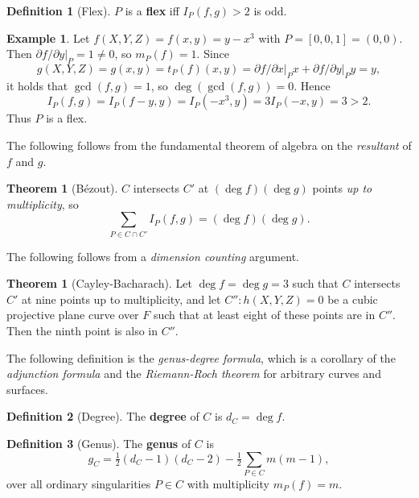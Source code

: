 \documentclass{article}
\newcommand{\val}[1]{\left. #1 \right\rvert}
\newcommand{\rb}[1]{\left( #1 \right)}
\renewcommand{\sb}[1]{\left[ #1 \right]}
\theoremstyle{definition}\newtheorem*{definition}{Definition}
\theoremstyle{definition}\newtheorem*{example}{Example}
\theoremstyle{definition}\newtheorem*{remark}{Remark}
\newtheorem{theorem}[proposition]{Theorem}
\begin{document}
\begin{definition}[Flex]
$ P $ is a \textbf{flex} iff $ I_P\rb{f, g} > 2 $ is odd.
\end{definition}

\begin{example}
Let $ f\rb{X, Y, Z} = f\rb{x, y} = y - x^3 $ with $ P = \sb{0, 0, 1} = \rb{0, 0} $. Then $ \val{\partial f / \partial y}_P = 1 \ne 0 $, so $ m_P\rb{f} = 1 $. Since
$$ g\rb{X, Y, Z} = g\rb{x, y} = t_P\rb{f}\rb{x, y} = \val{\partial f / \partial x}_Px + \val{\partial f / \partial y}_Py = y, $$
it holds that $ \gcd\rb{f, g} = 1 $, so $ \deg\rb{\gcd\rb{f, g}} = 0 $. Hence
$$ I_P\rb{f, g} = I_P\rb{f - y, y} = I_P\rb{-x^3, y} = 3I_P\rb{-x, y} = 3 > 2. $$
Thus $ P $ is a flex.
\end{example}

The following follows from the fundamental theorem of algebra on the \emph{resultant} of $ f $ and $ g $.

\begin{theorem}[Bézout]
$ C $ intersects $ C' $ at $ \rb{\deg f}\rb{\deg g} $ points \emph{up to multiplicity}, so
$$ \sum_{P \in C \cap C'} I_P\rb{f, g} = \rb{\deg f}\rb{\deg g}. $$
\end{theorem}

The following follows from a \emph{dimension counting} argument.

\begin{theorem}[Cayley-Bacharach]
Let $ \deg f = \deg g = 3 $ such that $ C $ intersects $ C' $ at nine points up to multiplicity, and let $ C'' : h\rb{X, Y, Z} = 0 $ be a cubic projective plane curve over $ F $ such that at least eight of these points are in $ C'' $. Then the ninth point is also in $ C'' $.
\end{theorem}

The following definition is the \emph{genus-degree formula}, which is a corollary of the \emph{adjunction formula} and the \emph{Riemann-Roch theorem} for arbitrary curves and surfaces.

\begin{definition}[Degree]
The \textbf{degree} of $ C $ is $ d_C = \deg f $.
\end{definition}

\begin{definition}[Genus]
The \textbf{genus} of $ C $ is
$$ g_C = \tfrac{1}{2}\rb{d_C - 1}\rb{d_C - 2} - \tfrac{1}{2}\sum_{P \in C} m\rb{m - 1}, $$
over all ordinary singularities $ P \in C $ with multiplicity $ m_P\rb{f} = m $.
\end{definition}
\end{document}
